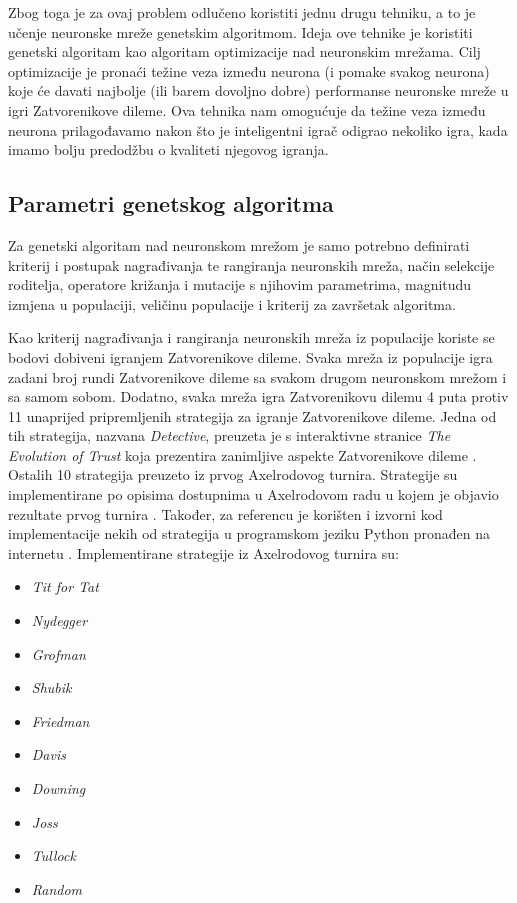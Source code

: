 \documentclass[zavrsnirad]{fer}
\begin{document}
	Zbog toga je za ovaj problem odlučeno koristiti jednu drugu tehniku, a to je učenje neuronske mreže genetskim algoritmom. Ideja ove tehnike je koristiti genetski algoritam kao algoritam optimizacije nad neuronskim mrežama. Cilj optimizacije je pronaći težine veza između neurona (i pomake svakog neurona) koje će davati najbolje (ili barem dovoljno dobre) performanse neuronske mreže u igri Zatvorenikove dileme. Ova tehnika nam omogućuje da težine veza između neurona prilagođavamo nakon što je inteligentni igrač odigrao nekoliko igra, kada imamo bolju predodžbu o kvaliteti njegovog igranja.
	
	\subsection{Parametri genetskog algoritma}
	\label{pog:ParametriGenetskogAlg}
	
		Za genetski algoritam nad neuronskom mrežom je samo potrebno definirati kriterij i postupak nagrađivanja te rangiranja neuronskih mreža, način selekcije roditelja, operatore križanja i mutacije s njihovim parametrima, magnitudu izmjena u populaciji, veličinu populacije i kriterij za završetak algoritma.
		
		Kao kriterij nagrađivanja i rangiranja neuronskih mreža iz populacije koriste se bodovi dobiveni igranjem Zatvorenikove dileme. Svaka mreža iz populacije igra zadani broj rundi Zatvorenikove dileme sa svakom drugom neuronskom mrežom i sa samom sobom. Dodatno, svaka mreža igra Zatvorenikovu dilemu 4 puta protiv 11 unaprijed pripremljenih strategija za igranje Zatvorenikove dileme. Jedna od tih strategija, nazvana \textit{Detective}, preuzeta je s interaktivne stranice \textit{The Evolution of Trust} koja prezentira zanimljive aspekte Zatvorenikove dileme \cite{NickyCase}. Ostalih 10 strategija preuzeto iz prvog Axelrodovog turnira. Strategije su implementirane po opisima dostupnima u Axelrodovom radu u kojem je objavio rezultate prvog turnira \cite{1980Axelrod1}. Također, za referencu je korišten i izvorni kod implementacije nekih od strategija u programskom jeziku Python pronađen na internetu \cite{AxelrodStratImplPython}. Implementirane strategije iz Axelrodovog turnira su: 
		\begin{itemize}
			\item \textit{Tit for Tat}
			\item \textit{Nydegger}
			\item \textit{Grofman}
			\item \textit{Shubik}
			\item \textit{Friedman}
			\item \textit{Davis}
			\item \textit{Downing}
			\item \textit{Joss}
			\item \textit{Tullock}
			\item \textit{Random}
		\end{itemize}
		
\end{document}

